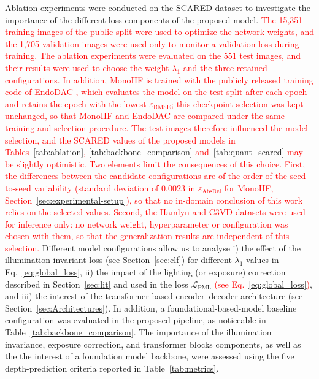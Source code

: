 \documentclass[a4paper,fleqn]{cas-dc}
\begin{document}
Ablation experiments were conducted on the SCARED dataset to investigate the importance of the different loss components of the proposed model. \textcolor{red}{The 15,351 training images of the public split were used to optimize the network weights, and the 1,705 validation images were used only to monitor a validation loss during training. The ablation experiments were evaluated on the 551 test images, and their results were used to choose the weight $\lambda_1$ and the three retained configurations. In addition, MonoIIF is trained with the publicly released training code of EndoDAC \citep{EndoDAC_MICCAI_2024}, which evaluates the model on the test split after each epoch and retains the epoch with the lowest $\varepsilon_\textrm{RMSE}$; this checkpoint selection was kept unchanged, so that MonoIIF and EndoDAC are compared under the same training and selection procedure. The test images therefore influenced the model selection, and the SCARED values of the proposed models in Tables~\ref{tab:ablation}, \ref{tab:backbone_comparison} and~\ref{tab:quant_scared} may be slightly optimistic. Two elements limit the consequences of this choice. First, the differences between the candidate configurations are of the order of the seed-to-seed variability (standard deviation of $0.0023$ in $\varepsilon_\textrm{AbsRel}$ for MonoIIF, Section~\ref{sec:experimental-setup}), so that no in-domain conclusion of this work relies on the selected values. Second, the Hamlyn and C3VD datasets were used for inference only: no network weight, hyperparameter or configuration was chosen with them, so that the generalization results are independent of this selection.} Different model configurations allow us to analyse i) the effect of the illumination-invariant loss (see Section~\ref{sec:clf}) for different $\lambda_1$ values in Eq.~\eqref{eq:global_loss}, ii) the impact of the lighting (or exposure) correction described in Section~\ref{sec:lit} and used in the loss $\mathcal{L}_\textrm{PML}$ \textcolor{red}{(see Eq.~\eqref{eq:global_loss})}, and iii) the interest of the transformer-based encoder–decoder architecture (see Section~\ref{sec:Architectures}). In addition, a foundational-based-model baseline configuration was evaluated in the proposed pipeline, as noticeable in Table~\ref{tab:backbone_comparison}. The importance of the illumination invariance, exposure correction, and transformer blocks components, as well as the the interest of a foundation model backbone, were assessed using the five depth-prediction criteria reported in Table~\ref{tab:metrics}.  
\end{document}
